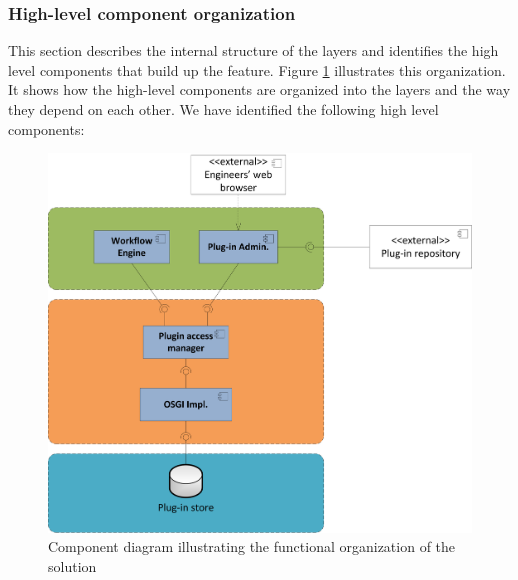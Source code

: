 \subsubsection{High-level component organization}

This section describes the internal structure of the layers and identifies the high level components that build up the feature. Figure \ref{fig_funcorg} illustrates this organization. It shows how the high-level components are organized into the layers and the way they depend on each other. We have identified the following high level components:

\begin{figure}[h!]
  \centering
  	\includegraphics[scale=0.6]{plug-in/layers/main-func.png}
  \caption{Component diagram illustrating the functional organization of the solution}
  \label{fig_funcorg}
\end{figure}

